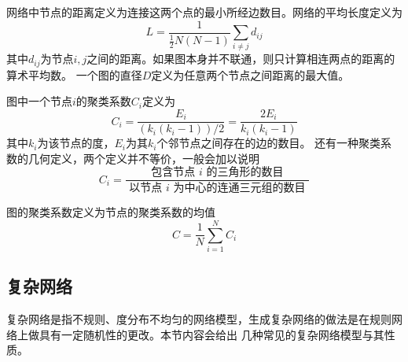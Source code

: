 网络中节点的距离定义为连接这两个点的最小所经边数目。网络的平均长度定义为
\begin{equation}
    L=\frac{1}{\frac{1}{2} N(N-1)} \sum_{i \neq j} d_{i j}
\end{equation}
其中$d_{ij}$为节点$i,j$之间的距离。如果图本身并不联通，则只计算相连两点的距离的算术平均数。
一个图的直径$D$定义为任意两个节点之间距离的最大值。
\begin{definition}
    图中一个节点$i$的聚类系数$C_i$定义为
\begin{equation}
    C_i=\frac{E_i}{\left(k_i\left(k_i-1\right)\right) / 2}=\frac{2 E_i}{k_i\left(k_i-1\right)}
\end{equation}
其中$k_i$为该节点的度，$E_i$为其$k_i$个邻节点之间存在的边的数目。
还有一种聚类系数的几何定义，两个定义并不等价，一般会加以说明
\begin{equation}
    C_i=\frac{\text { 包含节点 } i \text { 的三角形的数目 }}{\text { 以节点 } i \text { 为中心的连通三元组的数目 }}
\end{equation}
\end{definition}
图的聚类系数定义为节点的聚类系数的均值
\begin{equation}
    C=\frac{1}{N} \sum_{i=1}^N C_i
\end{equation}
\subsection{复杂网络}
复杂网络是指不规则、度分布不均匀的网络模型，生成复杂网络的做法是在规则网络上做具有一定随机性的更改。本节内容会给出
几种常见的复杂网络模型与其性质。
